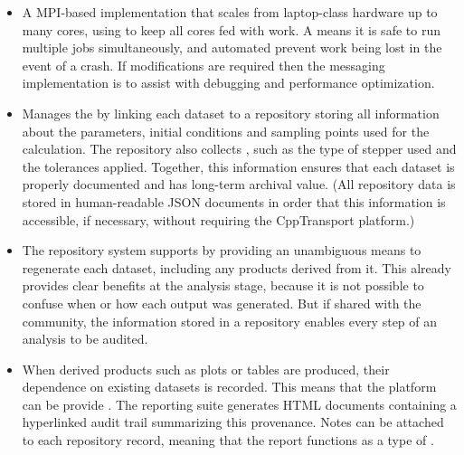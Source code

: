 \documentclass[11pt,a4paper]{article}
\newcommand{\packagefont}{\sffamily}
\newcommand{\CppTransport}{{\packagefont CppTransport}}
\newcommand{\MPI}{{\packagefont MPI}}
\newcommand{\semibold}[1]{{\fontseries{b}\selectfont{#1}}}
\begin{document}
\begin{itemize}
    \item A \semibold{fully parallelized} {\MPI}-based implementation that
    scales from laptop-class hardware up to many cores, using
    \semibold{adaptive load-balancing} to keep all cores fed with work.
    A \semibold{transactional design} means it is safe to run multiple
    jobs simultaneously,
    and automated \semibold{checkpointing and recovery} prevent
    work being lost in the event of a crash.
    If modifications are required then the messaging implementation is
    \semibold{automatically instrumented} to assist with debugging and
    performance optimization.
    
    \item Manages the \semibold{data lifecycle} by
    linking each dataset
    to a repository
    storing all information
    about the parameters, initial conditions and sampling points
    used for the calculation.
    The repository also collects \semibold{metadata about the integration},
    such as the type of stepper used and the tolerances applied.
    Together, this information
    ensures that each dataset is properly documented and
    has long-term archival value.
    (All repository data is stored in human-readable
    JSON documents in order that this information is accessible, if necessary,
    without requiring the {\CppTransport} platform.)
    
    \item The repository system
    supports \semibold{reproducible research} by providing
    an unambiguous means to regenerate
    each dataset, including any products derived
    from it.
    This already provides clear benefits at the analysis stage, because it
    is not possible to confuse when or how each
    output was generated.
    But if shared with the community, the information stored
    in a repository
    enables every step of an analysis to
    be audited.
        
    \item When derived products such as plots or tables are produced,
    their dependence on existing datasets is recorded.
    This means that the platform can be provide \semibold{a detailed
    provenance for any data product tracked by the repository}.
    The reporting suite generates
    HTML documents containing a hyperlinked
    audit trail summarizing this provenance.
    Notes can be attached to each repository record, meaning that
    the report functions as a type of \semibold{electronic
    laboratory notebook}.
    

\end{itemize}
\end{document}
